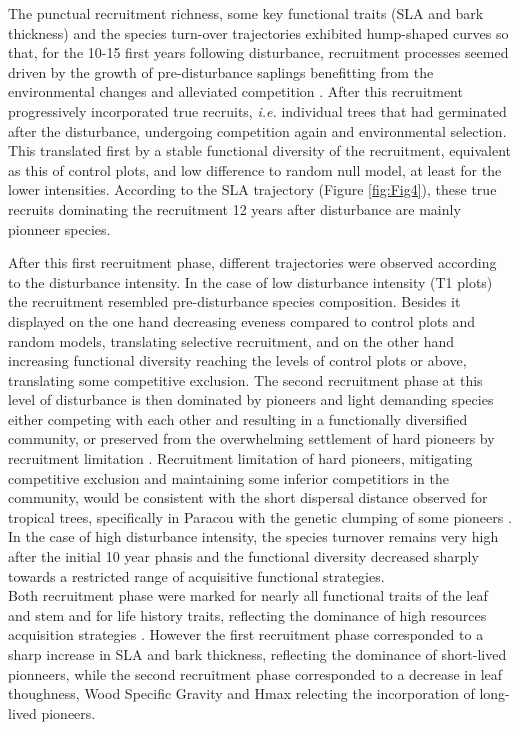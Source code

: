 \documentclass[fleqn,10pt]{ArtEcoFoG} %
\begin{document}
The punctual recruitment richness, some key functional traits (SLA and
bark thickness) and the species turn-over trajectories exhibited
hump-shaped curves so that, for the 10-15 first years following
disturbance, recruitment processes seemed driven by the growth of
pre-disturbance saplings benefitting from the environmental changes and
alleviated competition \citep{Herault2010}. After this recruitment
progressively incorporated true recruits, \emph{i.e.} individual trees
that had germinated after the disturbance, undergoing competition again
and environmental selection. This translated first by a stable
functional diversity of the recruitment, equivalent as this of control
plots, and low difference to random null model, at least for the lower
intensities. According to the SLA trajectory (Figure \ref{fig:Fig4}),
these true recruits dominating the recruitment 12 years after
disturbance are mainly pionneer species.

After this first recruitment phase, different trajectories were observed
according to the disturbance intensity. In the case of low disturbance
intensity (T1 plots) the recruitment resembled pre-disturbance species
composition. Besides it displayed on the one hand decreasing eveness
compared to control plots and random models, translating selective
recruitment, and on the other hand increasing functional diversity
reaching the levels of control plots or above, translating some
competitive exclusion. The second recruitment phase at this level of
disturbance is then dominated by pioneers and light demanding species
either competing with each other and resulting in a functionally
diversified community, or preserved from the overwhelming settlement of
hard pioneers by recruitment limitation
\citep{Hubbell1999, Sheil2003, Bongers2009}. Recruitment limitation of
hard pioneers, mitigating competitive exclusion and maintaining some
inferior competitiors in the community, would be consistent with the
short dispersal distance observed for tropical trees, specifically in
Paracou with the genetic clumping of some pioneers
\citep{Leclerc2015, Scotti2015a}. In the case of high disturbance
intensity, the species turnover remains very high after the initial 10
year phasis and the functional diversity decreased sharply towards a
restricted range of acquisitive functional strategies.\\
Both recruitment phase were marked for nearly all functional traits of
the leaf and stem and for life history traits, reflecting the dominance
of high resources acquisition strategies
\citep{Wright2004, Chave2009b, Herault2011, Reich2014}. However the
first recruitment phase corresponded to a sharp increase in SLA and bark
thickness, reflecting the dominance of short-lived pionneers, while the
second recruitment phase corresponded to a decrease in leaf thoughness,
Wood Specific Gravity and Hmax relecting the incorporation of long-lived
pioneers.
\end{document}
